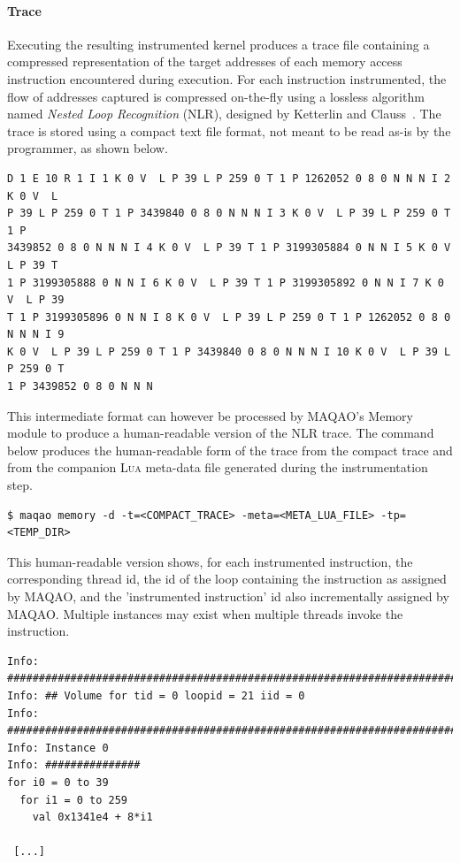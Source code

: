 \documentclass[11pt, a4paper, twoside]{montblanc2}
\def\lua{\textsc{Lua}\xspace}
\begin{document}
\paragraph{Trace}

Executing the resulting instrumented kernel produces a trace file containing a 
compressed representation of the target addresses of each memory access 
instruction encountered during execution. For each instruction instrumented, the 
flow of addresses captured is compressed on-the-fly using a lossless
algorithm named \emph{Nested Loop Recognition} (NLR), designed by Ketterlin and 
Clauss~\cite{ketterlin:nlr:cgo:2008}. The trace is stored using a compact text 
file format, not meant to be read as-is by the programmer, as shown below.

\begin{footnotesize}
\begin{verbatim}
D 1 E 10 R 1 I 1 K 0 V  L P 39 L P 259 0 T 1 P 1262052 0 8 0 N N N I 2 K 0 V  L 
P 39 L P 259 0 T 1 P 3439840 0 8 0 N N N I 3 K 0 V  L P 39 L P 259 0 T 1 P 
3439852 0 8 0 N N N I 4 K 0 V  L P 39 T 1 P 3199305884 0 N N I 5 K 0 V  L P 39 T 
1 P 3199305888 0 N N I 6 K 0 V  L P 39 T 1 P 3199305892 0 N N I 7 K 0 V  L P 39 
T 1 P 3199305896 0 N N I 8 K 0 V  L P 39 L P 259 0 T 1 P 1262052 0 8 0 N N N I 9 
K 0 V  L P 39 L P 259 0 T 1 P 3439840 0 8 0 N N N I 10 K 0 V  L P 39 L P 259 0 T 
1 P 3439852 0 8 0 N N N 
\end{verbatim}
\end{footnotesize}

This intermediate format can however be processed by MAQAO's Memory module to 
produce a human-readable version of the NLR trace. The command below produces
the human-readable form of the trace from the compact trace and from the companion
\lua meta-data file generated during the instrumentation step.
 
\begin{verbatim}
$ maqao memory -d -t=<COMPACT_TRACE> -meta=<META_LUA_FILE> -tp=<TEMP_DIR>
\end{verbatim}

This human-readable version shows, for each instrumented instruction, the
corresponding thread id, the id of the loop containing the instruction as
assigned by MAQAO, and the 'instrumented instruction' id also incrementally
assigned by MAQAO. Multiple instances may exist when multiple threads invoke
the instruction.

\begin{footnotesize}
\begin{verbatim}
Info: ################################################################################
Info: ## Volume for tid = 0 loopid = 21 iid = 0
Info: ################################################################################
Info: Instance 0
Info: ###############
for i0 = 0 to 39
  for i1 = 0 to 259
    val 0x1341e4 + 8*i1

 [...]
\end{verbatim}
\end{footnotesize}
\end{document}
